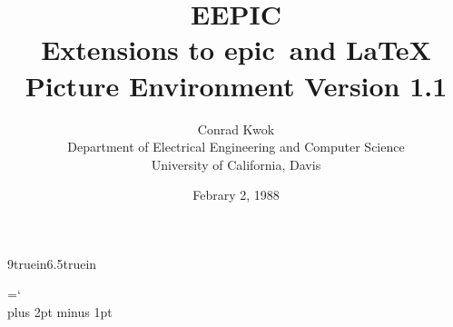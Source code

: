 
% 
% 
% 
\makeatletter
\def\docspecials{\do\ \do\$\do\&%
  \do\#\do\^\do\^^K\do\_\do\^^A\do\%\do\~}
%
\def\alltt{\trivlist \item[]\if@minipage\else\vskip\parskip\fi
\leftskip\@totalleftmargin\rightskip\z@
\parindent\z@\parfillskip\@flushglue\parskip\z@
\@tempswafalse \def\par{\if@tempswa\hbox{}\fi\@tempswatrue\@@par}
\obeylines \tt \catcode``=13 \@noligs \let\do\@makeother \docspecials
 \frenchspacing\@vobeyspaces}
%
\let\endalltt=\endtrivlist
\makeatother

\topmargin=-37pt\oddsidemargin=0pt\evensidemargin=0pt
\marginparsep 10pt\marginparwidth 60pt
\textheight 9truein\textwidth 6.5truein

\chardef\BS=`\\ %
\newcommand{\PiCTeX}{PiC\TeX}
\newcommand{\epic}{{\sc epic}}
\newcommand{\eepic}{{\sc eepic}}
\newcommand{\plotchar}{\makebox(0,0){\large $\otimes$}}
\parskip=4pt plus 2pt minus 1pt
\title{EEPIC\\Extensions to epic\ and \LaTeX \\ Picture
Environment Version 1.1}
\author{Conrad Kwok\\
  Department of Electrical Engineering and Computer Science\\
  University of California, Davis}
\date{Febrary 2, 1988}

\maketitle



